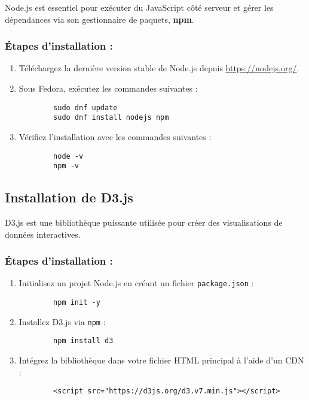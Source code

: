 \documentclass{article}
\begin{document}
Node.js est essentiel pour exécuter du JavaScript côté serveur et gérer les dépendances via son gestionnaire de paquets, \textbf{npm}.

\subsubsection*{Étapes d'installation :}
\begin{enumerate}
    \item Téléchargez la dernière version stable de Node.js depuis \url{https://nodejs.org/}.
    \item Sous Fedora, exécutez les commandes suivantes :
    \begin{verbatim}
        sudo dnf update
        sudo dnf install nodejs npm
    \end{verbatim}
    \item Vérifiez l'installation avec les commandes suivantes :
    \begin{verbatim}
        node -v
        npm -v
    \end{verbatim}
\end{enumerate}

\subsection{Installation de D3.js}

D3.js est une bibliothèque puissante utilisée pour créer des visualisations de données interactives.

\subsubsection*{Étapes d'installation :}
\begin{enumerate}
    \item Initialisez un projet Node.js en créant un fichier \texttt{package.json} :
    \begin{verbatim}
        npm init -y
    \end{verbatim}
    \item Installez D3.js via \texttt{npm} :
    \begin{verbatim}
        npm install d3
    \end{verbatim}
    \item Intégrez la bibliothèque dans votre fichier HTML principal à l'aide d'un CDN :
    \begin{verbatim}
        <script src="https://d3js.org/d3.v7.min.js"></script>
    \end{verbatim}
\end{enumerate}
\end{document}
